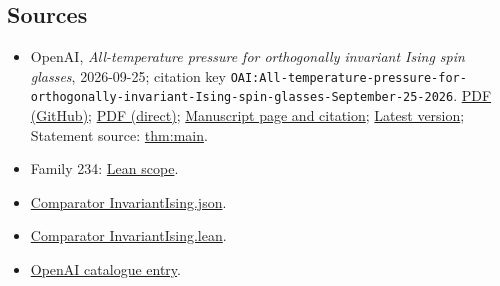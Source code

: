 \documentclass[11pt]{article}
\begin{document}
\subsection{Sources}
\begin{itemize}
\item OpenAI, \emph{All-temperature pressure for orthogonally invariant Ising spin glasses}, 2026-09-25; citation key \texttt{OAI:All-temperature-pressure-for-orthogonally-invariant-Ising-spin-glasses-September-25-2026}. \href{https://github.com/openai/math/blob/adc7f1241b42e322a6451854ab7e4b4c146bf78a/preprints/All-temperature-pressure-for-orthogonally-invariant-Ising-spin-glasses-September-25-2026/paper.pdf}{PDF (GitHub)}; \href{https://github.com/openai/math/raw/adc7f1241b42e322a6451854ab7e4b4c146bf78a/preprints/All-temperature-pressure-for-orthogonally-invariant-Ising-spin-glasses-September-25-2026/paper.pdf}{PDF (direct)}; \href{https://github.com/openai/math/blob/adc7f1241b42e322a6451854ab7e4b4c146bf78a/preprints/All-temperature-pressure-for-orthogonally-invariant-Ising-spin-glasses-September-25-2026/README.md}{Manuscript page and citation}; \href{https://github.com/openai/math/blob/main/preprints/All-temperature-pressure-for-orthogonally-invariant-Ising-spin-glasses-September-25-2026/paper.pdf}{Latest version}; Statement source: \href{https://github.com/openai/math/blob/adc7f1241b42e322a6451854ab7e4b4c146bf78a/preprints/All-temperature-pressure-for-orthogonally-invariant-Ising-spin-glasses-September-25-2026/build/invariant-sk.tex\#L186}{thm:main}.
\item Family 234: \href{https://github.com/openai/math/blob/adc7f1241b42e322a6451854ab7e4b4c146bf78a/lean/docs/234.md}{Lean scope}.
\item \href{https://github.com/openai/math/blob/adc7f1241b42e322a6451854ab7e4b4c146bf78a/lean/ComparatorChallenges/InvariantIsing.json}{Comparator InvariantIsing.json}.
\item \href{https://github.com/openai/math/blob/adc7f1241b42e322a6451854ab7e4b4c146bf78a/lean/ComparatorChallenges/InvariantIsing.lean}{Comparator InvariantIsing.lean}.
\item \href{https://github.com/openai/math/blob/adc7f1241b42e322a6451854ab7e4b4c146bf78a/CONTENTS.md}{OpenAI catalogue entry}.
\end{itemize}
\end{document}
